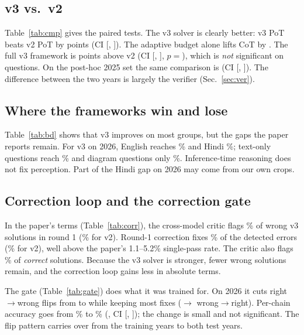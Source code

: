 \documentclass[conference]{IEEEtran}
\begin{document}
\subsection{v3 vs.\ v2}

Table~\ref{tab:cmp} gives the paired tests. The v3 solver is clearly better: v3 PoT beats v2 PoT
by \PotVsDiff{} points (CI [\PotVsLo, \PotVsHi]). The adaptive budget alone lifts CoT by
\ExtVsDiff. The full v3 framework is \VsDiff{} points above v2 (CI [\VsLo, \VsHi],
$p{=}$\VsP), which is \emph{not} significant on \NTest{} questions. On the post-hoc 2025 set the
same comparison is \PostVsDiff{} (CI [\PostVsLo, \PostVsHi]). The difference between the two
years is largely the verifier (Sec.~\ref{sec:ver}).

\subsection{Where the frameworks win and lose}

Table~\ref{tab:bd} shows that v3 improves on most groups, but the gaps the paper reports remain.
For v3 on 2026, English reaches \ThreeEn\% and Hindi \ThreeHin\%; text-only questions reach
\ThreeTxt\% and diagram questions only \ThreeImg\%. Inference-time reasoning does not fix
perception. Part of the Hindi gap on 2026 may come from our own crops.

\subsection{Correction loop and the correction gate}


In the paper's terms (Table~\ref{tab:corr}), the cross-model critic flags \EpThree\% of wrong v3
solutions in round 1 (\EpTwo\% for v2). Round-1 correction fixes \EcThree\% of the detected errors
(\EcTwo\% for v2), well above the paper's 1.1--5.2\% single-pass rate. The critic also flags
\FaThree\% of \emph{correct} solutions. Because the v3 solver is stronger, fewer wrong solutions
remain, and the correction loop gains less in absolute terms.

The gate (Table~\ref{tab:gate}) does what it was trained for. On 2026 it cuts right$\to$wrong
flips from \GateRtwU{} to \GateRtwG{} while keeping most fixes (\GateWtrU$\to$\GateWtrG{}
wrong$\to$right). Per-chain accuracy goes from \GateAccU\% to \GateAccG\% (\GateVsDiff{}, CI
[\GateVsLo, \GateVsHi]); the change is small and not significant. The flip pattern carries over
from the training years to both test years.
\end{document}
